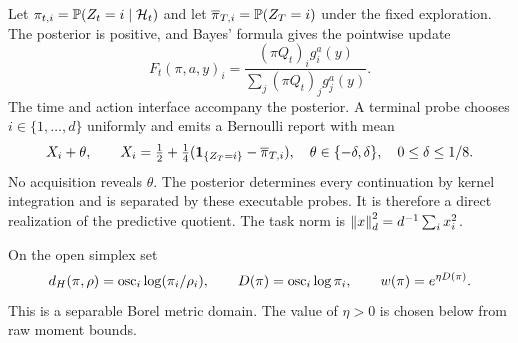 Let $\pi_{t,i}=\mathbb P(Z_t=i\mid\mathcal H_t)$ and let $\overline\pi_{T,i}=\mathbb P(Z_T=i)$ under the fixed exploration. The posterior is positive, and Bayes' formula gives the pointwise update
\begin{equation}\label{eq:bayes}
 F_t(\pi,a,y)_i=\frac{(\pi Q_t)_i g_i^a(y)}{\sum_j(\pi Q_t)_j g_j^a(y)}.
\end{equation}
The time and action interface accompany the posterior. A terminal probe chooses $i\in\{1,\ldots,d\}$ uniformly and emits a Bernoulli report with mean
\begin{equation}\label{eq:filtertask}
 X_i+\theta,\qquad
 X_i=\tfrac12+\tfrac14(\mathbf 1_{\{Z_T=i\}}-\overline\pi_{T,i}),
 \quad\theta\in\{-\delta,\delta\},\quad0\le\delta\le1/8.
\end{equation}
No acquisition reveals $\theta$. The posterior determines every continuation by kernel integration and is separated by these executable probes. It is therefore a direct realization of the predictive quotient. The task norm is $\left\lVert x\right\rVert_d^2=d^{-1}\sum_i x_i^2$.

On the open simplex set
\[
 d_H(\pi,\rho)=\operatorname{osc}_i\log(\pi_i/\rho_i),\qquad
 D(\pi)=\operatorname{osc}_i\log\pi_i,\qquad w(\pi)=e^{\eta D(\pi)}.
\]
This is a separable Borel metric domain. The value of $\eta>0$ is chosen below from raw moment bounds.

